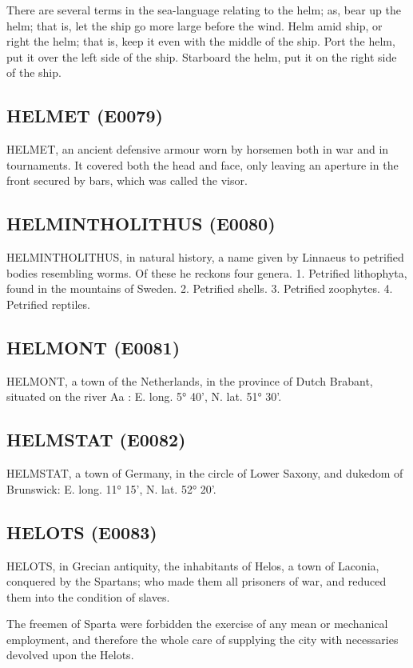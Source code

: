 \documentclass{article}
\begin{document}
There are several terms in the sea-language relating to the helm; as, bear up the helm; that is, let the ship go more large before the wind. Helm amid ship, or right the helm; that is, keep it even with the middle of the ship. Port the helm, put it over the left side of the ship. Starboard the helm, put it on the right side of the ship.

\subsection*{HELMET (E0079)}
HELMET, an ancient defensive armour worn by horsemen both in war and in tournaments. It covered both the head and face, only leaving an aperture in the front secured by bars, which was called the visor.

\subsection*{HELMINTHOLITHUS (E0080)}
HELMINTHOLITHUS, in natural history, a name given by Linnaeus to petrified bodies resembling worms. Of these he reckons four genera. 1. Petrified lithophyta, found in the mountains of Sweden. 2. Petrified shells. 3. Petrified zoophytes. 4. Petrified reptiles.

\subsection*{HELMONT (E0081)}
HELMONT, a town of the Netherlands, in the province of Dutch Brabant, situated on the river Aa : E. long. 5° 40', N. lat. 51° 30'.

\subsection*{HELMSTAT (E0082)}
HELMSTAT, a town of Germany, in the circle of Lower Saxony, and dukedom of Brunswick: E. long. 11° 15', N. lat. 52° 20'.

\subsection*{HELOTS (E0083)}
HELOTS, in Grecian antiquity, the inhabitants of Helos, a town of Laconia, conquered by the Spartans; who made them all prisoners of war, and reduced them into the condition of slaves.

The freemen of Sparta were forbidden the exercise of any mean or mechanical employment, and therefore the whole care of supplying the city with necessaries devolved upon the Helots.
\end{document}
